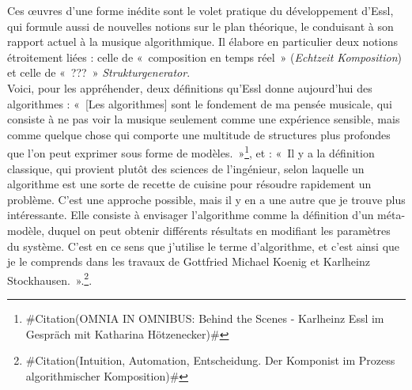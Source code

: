 \documentclass[a4paper,12pt]{article}
\newcommand{\guill}[1]{«~#1~»}
\newcommand{\zitat}[2]{\#Citation(#2)\#}
\begin{document}
Ces œuvres d'une forme inédite sont le volet pratique du développement d'Essl, qui formule aussi de nouvelles notions sur le plan théorique, le conduisant à son rapport actuel à la musique algorithmique. Il élabore en particulier deux notions étroitement liées : celle de \guill{composition en temps réel} (\emph{Echtzeit Komposition}) et celle de \guill{???} \emph{Strukturgenerator}. \\
Voici, pour les appréhender, deux définitions qu'Essl donne aujourd'hui des algorithmes : \guill{[Les algorithmes] sont le fondement de ma pensée musicale, qui consiste à ne pas voir la musique seulement comme une expérience sensible, mais comme quelque chose qui comporte une multitude de structures plus profondes que l'on peut exprimer sous forme de modèles.}\footnote{\zitat{\dots~weil wir ja immer noch über Algorithmen sprechen. Dieser Begriff hat nichts mit Rhythmen zu tun, sondern ist nach diesem Mathematiker al-Chwarizmi benannt, der verschiedene mathematische Konzepte eingeführt hat. Diese sind auch die Grundlage meines Musikdenkens, Musik nicht nur als ein sinnliches Erlebnis zu sehen, sondern als etwas, das viele Tiefendimensionen hat, die sich in Form von Modellen ausdrücken lassen.}
{OMNIA IN OMNIBUS: Behind the Scenes - Karlheinz Essl im Gespräch mit Katharina Hötzenecker}}, et : \guill{Il y a la définition classique, qui provient plutôt des sciences de l'ingénieur, selon laquelle un algorithme est une sorte de recette de cuisine pour résoudre rapidement un problème. C'est une approche possible, mais il y en a une autre que je trouve plus intéressante. Elle consiste à envisager l'algorithme comme la définition d'un méta-modèle, duquel on peut obtenir différents résultats en modifiant les paramètres du système. C'est en ce sens que j'utilise le terme d'algorithme, et c'est ainsi que je le comprends dans les travaux de Gottfried Michael Koenig et Karlheinz Stockhausen.}.\footnote{\zitat{Man sollte sich zunächst die Frage stellen, was denn ein Algorithmus ist. Da gibt es klassische Definitionen, die eher aus den Ingenieurswissenschaften kommen, die beschreiben den Algorithmus als eine Art Kochrezept um schnell zu einer Lösung zu kommen. Dies ist ein möglicher Ansatz, aber es gibt noch einen weiteren, den ich interessanter finde. Dort begreift man einen Algorithmus mehr als Definition eines Metamodells, aus dem heraus durch Veränderung der Systemparameter verschiedenste Resultate entstehen. Diesen Algorithmusbegriff verwende ich selber und finde ihn auch in Werken und Arbeiten von Gottfried Michael Koenig und Karlheinz Stockhausen.}
{Intuition, Automation, Entscheidung. Der Komponist im Prozess algorithmischer Komposition}}. \\
\end{document}
